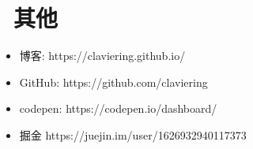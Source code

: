 \documentclass{resume}
\begin{document}

\section{\faInfo\ 其他}
\begin{itemize}[parsep=0.5ex]
  \item 博客: https://claviering.github.io/
  \item GitHub: https://github.com/claviering
  \item codepen: https://codepen.io/dashboard/
  \item 掘金 https://juejin.im/user/1626932940117373
\end{itemize}

%
%
\end{document}
